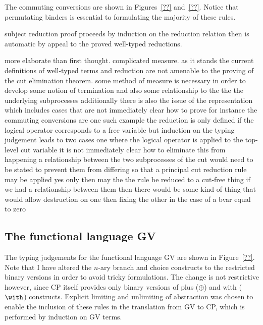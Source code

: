 




The commuting conversions are shown in Figures~\ref{??} and~\ref{??}. Notice
that permutating binders is essential to formulating the majority of these
rules.



subject reduction proof proceeds by induction on the reduction relation then
is automatic by appeal to the proved well-typed reductions.


more elaborate than first thought. complicated measure.  as it stands the
current definitions of well-typed terms and reduction are not amenable to the
proving of the cut elimination theorem. some method of measure is necessary in
order to develop some notion of termination and also some relationship to the
the the underlying subprocesses additionally there is also the issue of the
representation which includes cases that are not immediately clear how to
prove for instance the commuting conversions are one such example the
reduction is only defined if the logical operator corresponds to a free
variable but induction on the typing judgement leads to two cases one where
the logical operator is applied to the top-level cut variable it is not
immediately clear how to eliminate this from happening a relationship between
the two subprocesses of the cut would need to be stated to prevent them from
differing so that a principal cut reduction rule may be applied yes only then
may the the rule be reduced to a cut-free thing if we had a relationship
between them then there would be some kind of thing that would allow
destruction on one then fixing the other in the case of a bvar equal to zero

\subsection{The functional language GV}\label{sec:gv}



The typing judgements for the functional language GV are shown in
Figure~\ref{??}. Note that I have altered the $n$-ary branch and choice
constructs to the restricted binary versions in order to avoid tricky
formulations. The change is not restrictive however, since CP itself provides
only binary versions of plus ($\oplus$) and with ($\with$)
constructs. Explicit limiting and unlimiting of abstraction was chosen to
enable the inclusion of these rules in the translation from GV to CP, which is
performed by induction on GV terms.

